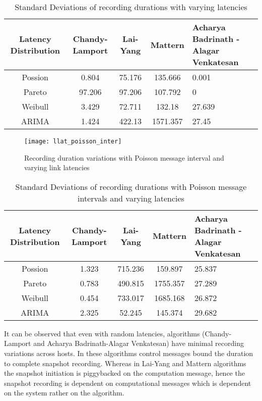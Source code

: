 \documentclass[12pt]{article}
\begin{document}
\begin{table*}[!htb]
\centering
\caption{Standard Deviations of recording durations with varying latencies}
\begin{tabular}{ccccp{4cm}}
\toprule Latency Distribution & Chandy-Lamport & Lai-Yang & Mattern & Acharya Badrinath - Alagar Venkatesan\\
\midrule Possion & 0.804 & 75.176 & 135.666 & 0.001 \\ Pareto & 97.206 & 97.206 & 107.792 & 0 \\ Weibull & 3.429 & 72.711 & 132.18 & 27.639 \\ ARIMA & 1.424 & 422.13 & 1571.357 & 27.45 \\
\bottomrule \end{tabular} 
\end{table*}

\begin{figure*}[!htb]
\centering
\texttt{[image: llat\_poisson\_inter]}
\caption{Recording duration variations with Poisson message interval and varying link latencies}
\end{figure*}

\begin{table*}[!htb]
\centering
\caption{Standard Deviations of recording durations with Poisson message intervals and varying latencies}
\begin{tabular}{ccccp{4cm}}
\toprule Latency Distribution & Chandy-Lamport & Lai-Yang & Mattern & Acharya Badrinath - Alagar Venkatesan\\
\midrule Possion & 1.323 & 715.236 & 159.897 & 25.837 \\ Pareto & 0.783 & 490.815 & 1755.357 & 27.289 \\ Weibull & 0.454 & 733.017 & 1685.168 & 26.872 \\ ARIMA & 2.325 & 52.245 & 145.374 & 29.682 \\
\bottomrule \end{tabular} 
\end{table*}

It can be observed that even with random latencies, algorithms (Chandy-Lamport and Acharya Badrinath-Alagar Venkatesan) have minimal recording variations across hosts. In these algorithms control messages bound the duration to complete snapshot recording. Whereas in Lai-Yang and Mattern algorithms the snapshot initiation is piggybacked on the computation message, hence the snapshot recording is dependent on computational messages which is dependent on the system rather on the algorithm. 
\end{document}
